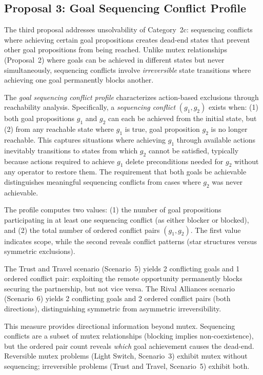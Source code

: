 \subsection{Proposal 3: Goal Sequencing Conflict Profile}
\label{sec:sequencing_conflict_profile}

The third proposal addresses unsolvability of Category~2c: sequencing conflicts where achieving certain goal propositions creates dead-end states that prevent other goal propositions from being reached. Unlike mutex relationships (Proposal~2) where goals can be achieved in different states but never simultaneously, sequencing conflicts involve \emph{irreversible} state transitions where achieving one goal permanently blocks another.

The \emph{goal sequencing conflict profile} characterizes action-based exclusions through reachability analysis. Specifically, a \emph{sequencing conflict} $(g_1, g_2)$ exists when: (1) both goal propositions $g_1$ and $g_2$ can each be achieved from the initial state, but (2) from any reachable state where $g_1$ is true, goal proposition $g_2$ is no longer reachable. This captures situations where achieving $g_1$ through available actions inevitably transitions to states from which $g_2$ cannot be satisfied, typically because actions required to achieve $g_1$ delete preconditions needed for $g_2$ without any operator to restore them. The requirement that both goals be achievable distinguishes meaningful sequencing conflicts from cases where $g_2$ was never achievable.

The profile computes two values: (1) the number of goal propositions participating in at least one sequencing conflict (as either blocker or blocked), and (2) the total number of ordered conflict pairs $(g_1, g_2)$. The first value indicates scope, while the second reveals conflict patterns (star structures versus symmetric exclusions).

The Trust and Travel scenario (Scenario~5) yields 2 conflicting goals and 1 ordered conflict pair: exploiting the remote opportunity permanently blocks securing the partnership, but not vice versa. The Rival Alliances scenario (Scenario~6) yields 2 conflicting goals and 2 ordered conflict pairs (both directions), distinguishing symmetric from asymmetric irreversibility.

This measure provides directional information beyond mutex. Sequencing conflicts are a subset of mutex relationships (blocking implies non-coexistence), but the ordered pair count reveals \emph{which} goal achievement causes the dead-end. Reversible mutex problems (Light Switch, Scenario~3) exhibit mutex without sequencing; irreversible problems (Trust and Travel, Scenario~5) exhibit both.

